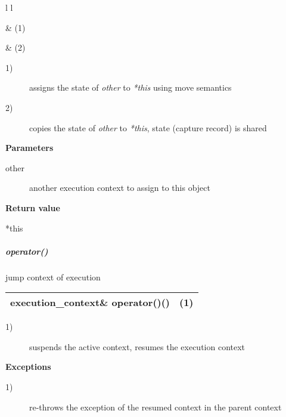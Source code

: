 \begin{tabular}{ l l }
    \midrule

     & (1)\\

    \midrule

     & (2)\\

    \midrule
\end{tabular}

\begin{description}
    \item[1)] assigns the state of \emph{other} to \emph{*this} using move semantics
    \item[2)] copies the state of \emph{other} to \emph{*this}, state (capture record)
              is shared
\end{description}

{\bfseries Parameters}
\begin{description}
    \item[other]   another execution context to assign to this object\\
\end{description}

{\bfseries Return value}
\begin{description}
    \item[*this]
\end{description}

\subparagraph*{operator()}
jump context of execution\\

\begin{tabular}{ l l }
    \midrule

    {\ttfamily\small\color{black}execution\_context\& {\color{blue}operator}()()} & (1)\\

    \midrule
\end{tabular}

\begin{description}
    \item[1)] suspends the active context, resumes the execution context\\
\end{description}

{\bfseries Exceptions}
\begin{description}
    \item[1)] re-throws the exception of the resumed context in the parent context\\
\end{description}

